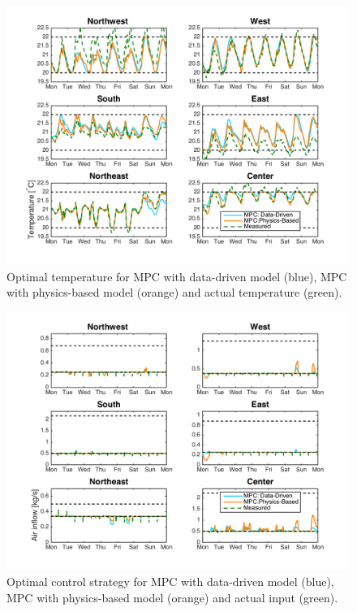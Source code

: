 \begin{figure}
\centering
\vspace*{-0.4cm}
\includegraphics[width=\textwidth]{chapters/building_model/figures/Comparison_Temp.png}
\vspace*{-0.5cm}
\caption{Optimal temperature for MPC with data-driven model (blue), MPC with physics-based model (orange) and actual temperature (green).}
\vspace*{-0.2cm}
\label{fig:MPC_comparison_temp}
\end{figure}

\begin{figure}
\centering
\includegraphics[width=\textwidth]{chapters/building_model/figures/Comparison_Flow.png}
\vspace*{-0.5cm}
\caption{Optimal control strategy for MPC with data-driven model (blue), MPC with physics-based model (orange) and actual input (green).}
\label{fig:MPC_comparison_flow}
\end{figure}

